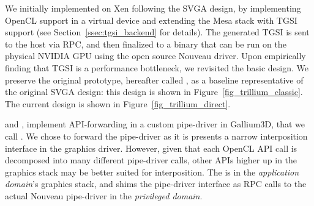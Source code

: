 

%

We initially implemented \Trillium on Xen following the SVGA
design, by implementing OpenCL support in a virtual device and extending
the Mesa stack with TGSI support (see Section~\ref{ssec:tgsi_backend}
for details). The generated TGSI is sent to the host via RPC, and then
finalized to a binary that can be run on the physical NVIDIA GPU using
the open source Nouveau driver.
Upon empirically finding that TGSI is a performance bottleneck, we revisited
the basic design. We preserve the original prototype, hereafter called \trxc,
as a baseline representative of the original SVGA design:
this design is shown in Figure~\ref{fig_trillium_classic}.
The current \Trillium design is shown in Figure~\ref{fig_trillium_direct}.

\trxc and \trxd, implement API-forwarding in a custom pipe-driver in Gallium3D,
that we call \shadowpipe. We chose to forward the pipe-driver as it is presents a
narrow interposition interface in the graphics driver. However, given that each OpenCL
API call is decomposed into many different pipe-driver calls,
other APIs higher up in the graphics stack may be better suited for interposition.
The \shadowpipe is in the \textit{application domain}'s graphics
stack, and shims the pipe-driver interface as RPC calls to the actual Nouveau
pipe-driver in the \textit{privileged domain}.

